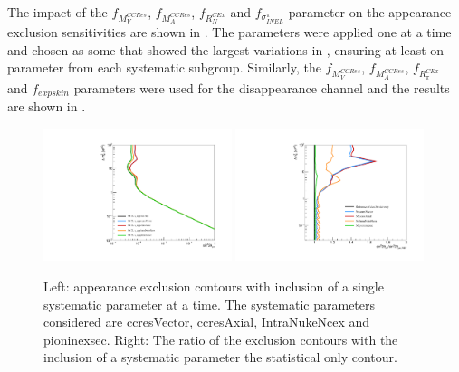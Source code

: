 The impact of the $f_{M_V^{CCRes}}$, $f_{M_A^{CCRes}}$, $f_{R_N^{C Ex}}$ and $f_{\sigma^{\pi}_{INEL}}$ parameter on the \nue appearance exclusion sensitivities are shown in . The parameters were applied one at a time and chosen as some that showed the largest variations in , ensuring at least on parameter from each systematic subgroup. Similarly, the $f_{M_V^{CCRes}}$, $f_{M_A^{CCRes}}$, $f_{R_{\pi}^{C Ex}}$ and $f_{expskin}$ parameters were used for the \nue disappearance channel and the results are shown in .

\begin{figure}[h!]
    \centering
    \includegraphics[width = 0.49\textwidth]{figures-chap6/exclusion_contours/single_param/nue_app_single_param.pdf}
    \includegraphics[width =0.49\textwidth]{figures-chap6/exclusion_contours/single_param/nue_app_single_param_ratio.pdf}
    \caption[\nue appearance exclusion contours with inclusion of a single systematic parameter at a time.]{Left: \nue appearance exclusion contours with inclusion of a single systematic parameter at a time. The systematic parameters considered are ccresVector, ccresAxial, IntraNukeNcex and pioninexsec. Right: The ratio of the exclusion contours with the inclusion of a systematic parameter the statistical only contour.}
    \label{fig:nue_app_single_param}
\end{figure}

